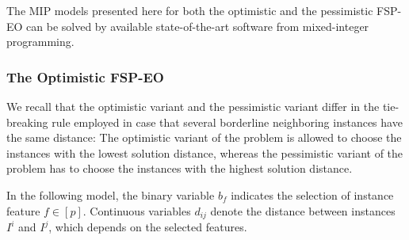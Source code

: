 \documentclass[11pt, a4paper]{article}
\newcommand{\fspeo}{FSP-EO\xspace}
\begin{document}
The MIP models presented here for both the optimistic and the pessimistic \fspeo can be solved by available state-of-the-art software from mixed-integer programming. 

\subsubsection{The Optimistic \fspeo}\label{subsec:optimistic_fspeo_mip} %
We recall that the optimistic variant and the pessimistic variant differ in the tie-breaking rule employed in case that several borderline neighboring instances have the same distance: The optimistic variant of the problem is allowed to choose the instances with the lowest solution distance, whereas the pessimistic variant of the problem has to choose the instances with the highest solution distance.

In the following model, the binary variable $b_f$ indicates the selection of instance feature $f\in[p]$.
Continuous variables $d_{ij}$ denote the distance between instances $I^i$ and $I^j$, which depends on the selected features.
\end{document}
